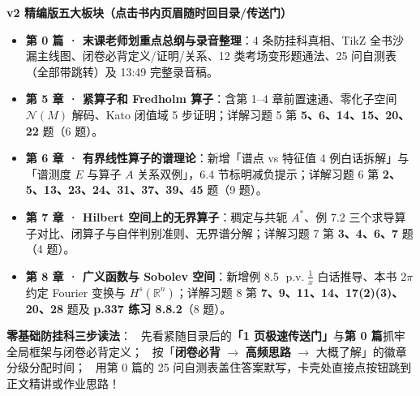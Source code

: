 \documentclass[11pt,a4paper]{article}
\newcommand{\CurrentChapterHeader}{泛函分析期末闭卷冲刺全集 v2}
\newcommand{\CircNum}[1]{%
  \tikz[baseline=(char.base)]{\node[shape=circle, fill=AccentMain, text=white, inner sep=1pt, font=\tiny\bfseries] (char) {#1};}\,%
}
\begin{document}
\vspace{8mm}
\begin{tcolorbox}[
  enhanced,
  colback=Ch0Soft!45!white,
  colframe=Ch0Main!25!BorderColor,
  boxrule=0.6pt,
  arc=6pt,
  left=12pt, right=12pt, top=10pt, bottom=10pt
]
  {\normalsize\bfseries\color{Ch0Main}v2 精编版五大板块（点击书内页眉随时回目录/传送门）}\\[5pt]
  \begin{itemize}[leftmargin=14pt, itemsep=5pt, topsep=2pt]
    \item \textcolor{Ch0Main}{\bfseries 第 0 篇 · 末课老师划重点总纲与录音整理}：4 条防挂科真相、TikZ 全书沙漏主线图、闭卷必背定义/证明/关系、12 类考场变形题通法、25 问自测表（全部带跳转）及 13:49 完整录音稿。
    \item \textcolor{Ch5Main}{\bfseries 第 5 章 · 紧算子和 Fredholm 算子}：含第 1–4 章前置速通、零化子空间 $\mathcal{N}(M)$ 解码、Kato 闭值域 5 步证明；详解习题 5 第 \textbf{5、6、14、15、20、22} 题（6 题）。
    \item \textcolor{Ch6Main}{\bfseries 第 6 章 · 有界线性算子的谱理论}：新增「谱点 vs 特征值 4 例白话拆解」与「谱测度 $E$ 与算子 $A$ 关系双例」，6.4 节标明减负提示；详解习题 6 第 \textbf{2、5、13、23、24、31、37、39、45} 题（9 题）。
    \item \textcolor{Ch7Main}{\bfseries 第 7 章 · Hilbert 空间上的无界算子}：稠定与共轭 $A^*$、例 7.2 三个求导算子对比、闭算子与自伴判别准则、无界谱分解；详解习题 7 第 \textbf{3、4、6、7} 题（4 题）。
    \item \textcolor{Ch8Main}{\bfseries 第 8 章 · 广义函数与 Sobolev 空间}：新增例 8.5 $\operatorname{p.v.}\frac{1}{x}$ 白话推导、本书 $2\pi$ 约定 Fourier 变换与 $H^s(\mathbb{R}^n)$；详解习题 8 第 \textbf{7、9、11、14、17(2)(3)、20、28} 题及 \textbf{p.337 练习 8.8.2}（8 题）。
  \end{itemize}
\end{tcolorbox}

\vspace{6mm}
{\small\color{MutedInk}
\textbf{零基础防挂科三步读法}：\CircNum{1} 先看紧随目录后的\textbf{「1 页极速传送门」}与\textbf{第 0 篇}抓牢全局框架与闭卷必背定义；\CircNum{2} 按「\textcolor{CoralMain}{\textbf{闭卷必背}} $\to$ \textcolor{AmberMain}{\textbf{高频思路}} $\to$ \textcolor{LightMain}{大概了解}」的徽章分级分配时间；\CircNum{3} 用第 0 篇的 25 问自测表盖住答案默写，卡壳处直接点按钮跳到正文精讲或作业思路！
}

\vfill
\clearpage

\hypertarget{book:toc}{}
\gdef\CurrentChapterHeader{全书交互目录}
\tableofcontents
\clearpage
\end{document}
